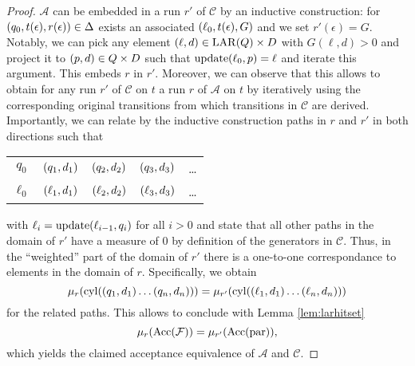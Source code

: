 \begin{proof}
  $\mathcal{A}$ can be embedded in a run $r'$ of $\mathcal{C}$ by an 
  inductive construction: for $\left(q_{0}, t(\epsilon), r(\epsilon)\right)\in
  \Delta$ exists an associated $\left(\ell_{0}, t(\epsilon), G\right)$ and we set
  $r'(\epsilon) = G$. Notably, we can pick any element 
  $\left(\ell, d\right)\in\operatorname{LAR}(Q)\times D$ with $G(\ell, d) > 0$ and project it to
  $\left(p, d\right)\in Q\times D$ such that $\operatorname{update}(\ell_{0}, p) = \ell$ and iterate
  this argument. This embeds $r$ in $r'$. Moreover, we can observe that this 
  allows to obtain for any run $r'$ of $\mathcal{C}$ on $t$ a run $r$ of 
  $\mathcal{A}$ on $t$ by iteratively using the corresponding original 
  transitions from which transitions in $\mathcal{C}$ are derived. Importantly, 
  we can relate by the inductive construction paths in $r$ and $r'$ in both 
  directions such that
  \begin{center}
    \begin{tabular}{ccccc}
      $q_{0}$ & $\left(q_{1}, d_{1}\right)$ & $\left(q_{2}, d_{2}\right)$ & 
        $\left(q_{3}, d_{3}\right)$ & \dots\\
      $\ell_{0}$ & $\left(\ell_{1}, d_{1}\right)$ & $\left(\ell_{2}, d_{2}\right)$ & 
        $\left(\ell_{3}, d_{3}\right)$ & \dots
    \end{tabular}
  \end{center}
  with $\ell_{i} = \operatorname{update}(\ell_{i-1}, q_{i})$ for all $i>0$ and state that all 
  other paths in the domain of $r'$ have a measure of $0$ by definition of the
  generators in $\mathcal{C}$. Thus, in the \enquote{weighted} part of the 
  domain of $r'$ there is a one-to-one correspondance to elements in the domain
  of $r$. Specifically, we obtain
  \begin{equation*}
    \mu_{r}(\operatorname{cyl}(\left(q_{1},d_{1}\right)\dots\left(q_{n},d_{n}\right))) = 
      \mu_{r'}(\operatorname{cyl}(\left(\ell_{1},d_{1}\right)\dots\left(\ell_{n},d_{n}\right)))
  \end{equation*}
  for the related paths. This allows to conclude with Lemma \ref{lem:larhitset}
  \begin{equation*}
    \mu_{r}(\operatorname{Acc}(\mathcal{F})) = \mu_{r'}(\operatorname{Acc}(\operatorname{par})),
  \end{equation*} 
  which yields the claimed acceptance equivalence of $\mathcal{A}$ and 
  $\mathcal{C}$.
\end{proof}

